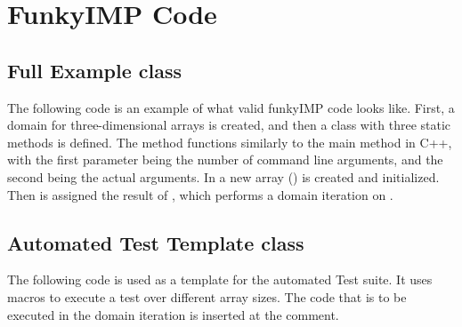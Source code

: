 \newpage

\section{FunkyIMP Code}
\label{sect:appendix_funky}
\subsection{Full Example class}
\label{sect:appendix_funky_full}
The following code is an example of what valid funkyIMP code looks like. First, a domain for three-dimensional arrays is created, and then a class with three static methods is defined. The  method functions similarly to the main method in C++, with the first parameter being the number of command line arguments, and the second being the actual arguments. In  a new array () is created and initialized. Then  is assigned the result of , which performs a domain iteration on . \\


\subsection{Automated Test Template class}
\label{sect:appendix_funky_template}
The following code is used as a template for the automated Test suite. It uses macros to execute a test over different array sizes. The code that is to be executed in the domain iteration is inserted at the \code{/*!!*/} comment.

